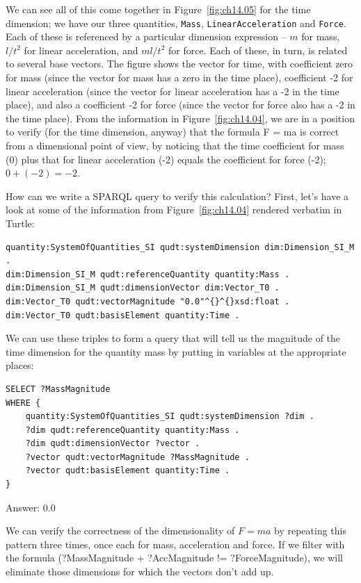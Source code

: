 We can see all of this come together in Figure~\ref{fig:ch14.05} for the time
dimension; we have our three
quantities, \texttt{Mass}, \texttt{LinearAcceleration} and \texttt{Force}. Each of these is
referenced by a particular dimension expression -- $m$ for mass, $l/{t^2}$ for
linear acceleration, and $ml/{t^2}$ for force. Each of these, in turn, is
related to several base vectors. The figure shows the vector for time,
with coefficient zero for mass (since the vector for mass has a zero in
the time place), coefficient -2 for linear acceleration
(since the vector for linear acceleration has a -2 in the time place),
and also a coefficient -2 for force (since the vector for force also has
a -2 in the time place). From the information in Figure~\ref{fig:ch14.04}, we are in
a position to verify (for the time dimension, anyway) that the formula F
= ma is correct from a dimensional point of view, by noticing that the
time coefficient for mass (0) plus that for linear acceleration (-2)
equals the coefficient for force (-2); $0 + (-2) = -2$.

How can we write a SPARQL query to verify this calculation? First, let's
have a look at some of the information from Figure~\ref{fig:ch14.04} rendered
verbatim in Turtle:

\begin{lstlisting}
quantity:SystemOfQuantities_SI qudt:systemDimension dim:Dimension_SI_M .
dim:Dimension_SI_M qudt:referenceQuantity quantity:Mass .
dim:Dimension_SI_M qudt:dimensionVector dim:Vector_T0 .
dim:Vector_T0 qudt:vectorMagnitude "0.0"^{}^{}xsd:float .
dim:Vector_T0 qudt:basisElement quantity:Time .
\end{lstlisting}

We can use these triples to form a query that will tell us the magnitude
of the time dimension for the quantity mass by putting in variables at
the appropriate places:

\begin{lstlisting}
SELECT ?MassMagnitude
WHERE {
    quantity:SystemOfQuantities_SI qudt:systemDimension ?dim .
    ?dim qudt:referenceQuantity quantity:Mass .
    ?dim qudt:dimensionVector ?vector .
    ?vector qudt:vectorMagnitude ?MassMagnitude .
    ?vector qudt:basisElement quantity:Time .
}
\end{lstlisting}

Answer: 0.0

We can verify the correctness of the dimensionality of $F = ma$ by
repeating this pattern three times, once each for mass, acceleration and
force. If we filter with the formula (?MassMagnitude + ?AccMagnitude != ?ForceMagnitude), we will eliminate those dimensions
for which the vectors
don't add up.

